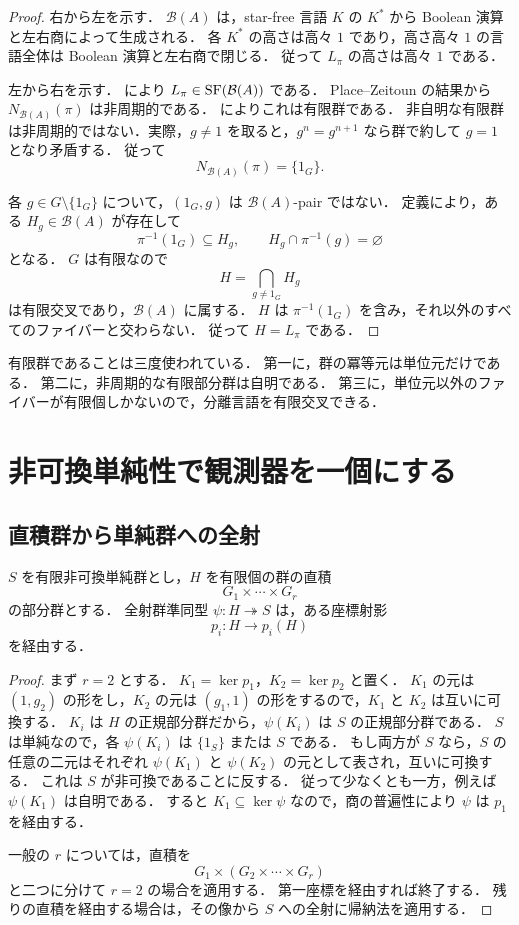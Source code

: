 \begin{proof}
右から左を示す．
$\mathcal B(A)$ は，star-free 言語 $K$ の $K^*$ から Boolean 演算と左右商によって生成される．
各 $K^*$ の高さは高々 $1$ であり，高さ高々 $1$ の言語全体は Boolean 演算と左右商で閉じる．
従って $L_\pi$ の高さは高々 $1$ である．

左から右を示す．
 により $L_\pi\in\operatorname{SF}(\mathcal B(A))$ である．
Place--Zeitoun の結果から $N_{\mathcal B(A)}(\pi)$ は非周期的である．
 によりこれは有限群である．
非自明な有限群は非周期的ではない．実際，$g\neq1$ を取ると，$g^n=g^{n+1}$ なら群で約して $g=1$ となり矛盾する．
従って
\[
N_{\mathcal B(A)}(\pi)=\{1_G\}.
\]

各 $g\in G\setminus\{1_G\}$ について，$(1_G,g)$ は $\mathcal B(A)$-pair ではない．
定義により，ある $H_g\in\mathcal B(A)$ が存在して
\[
\pi^{-1}(1_G)\subseteq H_g,
\qquad
H_g\cap\pi^{-1}(g)=\varnothing
\]
となる．
$G$ は有限なので
\[
H=\bigcap_{g\neq1_G}H_g
\]
は有限交叉であり，$\mathcal B(A)$ に属する．
$H$ は $\pi^{-1}(1_G)$ を含み，それ以外のすべてのファイバーと交わらない．
従って $H=L_\pi$ である．
\end{proof}

有限群であることは三度使われている．
第一に，群の冪等元は単位元だけである．
第二に，非周期的な有限部分群は自明である．
第三に，単位元以外のファイバーが有限個しかないので，分離言語を有限交叉できる．

\section{非可換単純性で観測器を一個にする}

\subsection{直積群から単純群への全射}

\begin{lemma}[一座標補題]\label{lem:group-coordinate}
$S$ を有限非可換単純群とし，$H$ を有限個の群の直積
\[
G_1\times\cdots\times G_r
\]
の部分群とする．
全射群準同型 $\psi:H\twoheadrightarrow S$ は，ある座標射影
\[
p_i:H\to p_i(H)
\]
を経由する．
\end{lemma}

\begin{proof}
まず $r=2$ とする．
$K_1=\ker p_1$，$K_2=\ker p_2$ と置く．
$K_1$ の元は $(1,g_2)$ の形をし，$K_2$ の元は $(g_1,1)$ の形をするので，$K_1$ と $K_2$ は互いに可換する．
$K_i$ は $H$ の正規部分群だから，$\psi(K_i)$ は $S$ の正規部分群である．
$S$ は単純なので，各 $\psi(K_i)$ は $\{1_S\}$ または $S$ である．
もし両方が $S$ なら，$S$ の任意の二元はそれぞれ $\psi(K_1)$ と $\psi(K_2)$ の元として表され，互いに可換する．
これは $S$ が非可換であることに反する．
従って少なくとも一方，例えば $\psi(K_1)$ は自明である．
すると $K_1\subseteq\ker\psi$ なので，商の普遍性により $\psi$ は $p_1$ を経由する．

一般の $r$ については，直積を
\[
G_1\times(G_2\times\cdots\times G_r)
\]
と二つに分けて $r=2$ の場合を適用する．
第一座標を経由すれば終了する．
残りの直積を経由する場合は，その像から $S$ への全射に帰納法を適用する．
\end{proof}

